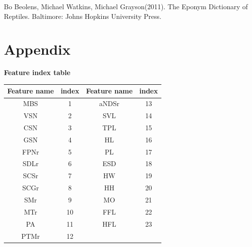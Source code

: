 \documentclass[12pt]{article}
\begin{document}
\newpage
\thispagestyle{plain}
\begin{thebibliography}{9}
Bo Beolens, Michael Watkins, Michael Grayson(2011).
The Eponym Dictionary of Reptiles.
Baltimore: Johns Hopkins University Press.
\end{thebibliography}

\newpage
\thispagestyle{plain}
\section*{Appendix}
\hypertarget{tab:feature}{}
\textbf{Feature index table} \\
\begin{center}
	\begin{tabular}{||c|c||c|c||}
		\hline
		Feature name & index & Feature name & index \\
		\hline
		MBS & 1 & aNDSr & 13 \\
		\hline
		VSN & 2 & SVL & 14 \\
		\hline
		CSN & 3 & TPL & 15 \\
		\hline
		GSN & 4 & HL & 16 \\
		\hline
		FPNr & 5 & PL & 17 \\
		\hline
		SDLr & 6 & ESD & 18 \\
		\hline
		SCSr & 7 & HW & 19 \\
		\hline
		SCGr & 8 & HH & 20 \\
		\hline
		SMr & 9 & MO & 21 \\
		\hline
		MTr & 10 & FFL & 22 \\
		\hline
		PA & 11 & HFL & 23 \\
		\hline
		PTMr & 12 & & \\
		\hline
	\end{tabular}
\end{center}
\end{document}

